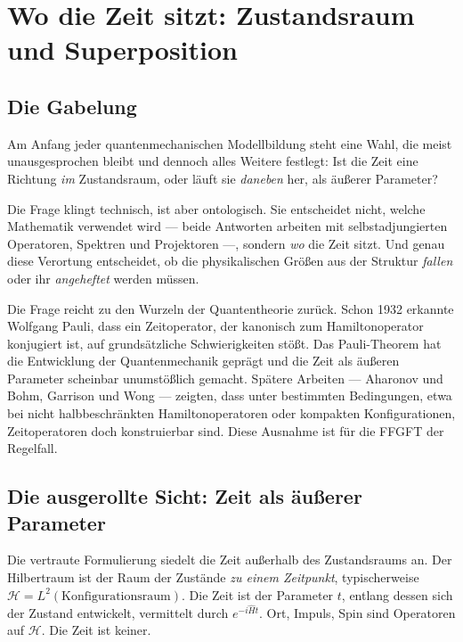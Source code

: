 \chapter{Wo die Zeit sitzt: Zustandsraum und Superposition}
\label{ch:zeit}

\section{Die Gabelung}

Am Anfang jeder quantenmechanischen Modellbildung steht eine Wahl, die
meist unausgesprochen bleibt und dennoch alles Weitere festlegt: Ist
die Zeit eine Richtung \emph{im} Zustandsraum, oder läuft sie
\emph{daneben} her, als äußerer Parameter?

Die Frage klingt technisch, ist aber ontologisch. Sie entscheidet nicht,
welche Mathematik verwendet wird --- beide Antworten arbeiten mit
selbstadjungierten Operatoren, Spektren und Projektoren ---, sondern
\emph{wo} die Zeit sitzt. Und genau diese Verortung entscheidet, ob die
physikalischen Größen aus der Struktur \emph{fallen} oder ihr
\emph{angeheftet} werden müssen.

Die Frage reicht zu den Wurzeln der Quantentheorie zurück. Schon 1932
erkannte Wolfgang Pauli, dass ein Zeitoperator, der kanonisch zum
Hamiltonoperator konjugiert ist, auf grundsätzliche Schwierigkeiten
stößt. Das Pauli-Theorem hat die Entwicklung der Quantenmechanik
geprägt und die Zeit als äußeren Parameter scheinbar unumstößlich
gemacht. Spätere Arbeiten --- Aharonov und Bohm, Garrison und Wong ---
zeigten, dass unter bestimmten Bedingungen, etwa bei nicht
halbbeschränkten Hamiltonoperatoren oder kompakten Konfigurationen,
Zeitoperatoren doch konstruierbar sind. Diese Ausnahme ist für die FFGFT
der Regelfall.

\section{Die ausgerollte Sicht: Zeit als äußerer Parameter}

Die vertraute Formulierung siedelt die Zeit außerhalb des Zustandsraums
an. Der Hilbertraum ist der Raum der Zustände \emph{zu einem
Zeitpunkt}, typischerweise $\mathcal{H} = L^2(\text{Konfigurationsraum})$.
Die Zeit ist der Parameter $t$, entlang dessen sich der Zustand
entwickelt, vermittelt durch $e^{-i\hat Ht}$. Ort, Impuls, Spin sind
Operatoren auf $\mathcal{H}$. Die Zeit ist keiner.

